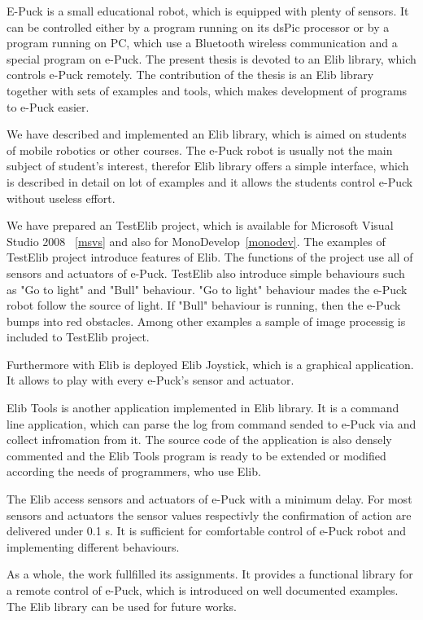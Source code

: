 E-Puck is a small educational robot, which is equipped with plenty of sensors. It can be controlled either
by a program running on its dsPic processor or by a program running on PC, which use a Bluetooth wireless communication and 
a special program on e-Puck.
The present thesis is devoted to an Elib library, which controls e-Puck remotely. The contribution of the thesis is 
an Elib library together with sets of examples and tools, which makes development of programs to e-Puck easier.

We have described and implemented an Elib library, which is aimed on students of mobile robotics or other courses.
The e-Puck robot is usually not the main subject of student's interest, therefor
Elib library offers a simple interface, which is described in detail on lot of examples and it allows the students control e-Puck
without useless effort.

We have prepared an TestElib project, which is available for Microsoft Visual Studio 2008 ~\ref{msvs} and also
for MonoDevelop~\ref{monodev}. The examples of TestElib project introduce features of Elib.
The functions of the project use all of sensors and actuators of e-Puck.
TestElib also introduce simple behaviours such as "Go to light" and "Bull" behaviour. "Go to light" behaviour
mades the e-Puck robot follow the source of light. If "Bull" behaviour is running, then the e-Puck
bumps into red obstacles.
Among other examples a sample of image processig is included to TestElib project.

Furthermore with Elib is deployed Elib Joystick, which is a graphical application. It allows to play with every e-Puck's sensor and actuator.

Elib Tools is another application implemented in Elib library. It is a command line application, which can parse the log from command sended to e-Puck via and collect infromation from it.
The source code of the application is also densely commented and the Elib Tools program is  ready to be extended or modified according the needs
of programmers, who use Elib.

The Elib access sensors and actuators of e-Puck with a minimum delay. 
For most sensors and actuators the sensor values respectivly the confirmation of action
are delivered under 0.1 s.
It is sufficient for comfortable control of e-Puck robot and implementing different behaviours.

As a whole, the work fullfilled its assignments. It provides a functional library for
a remote control of e-Puck, which is introduced on well documented examples.
The Elib library can be used for future works.

